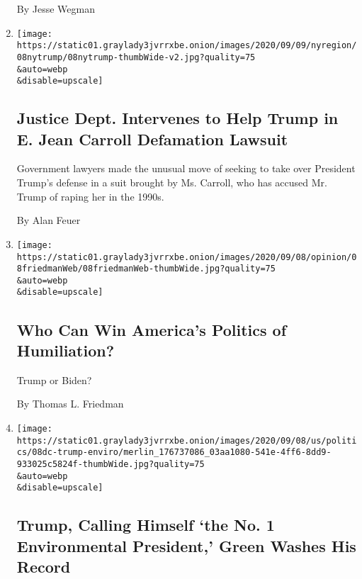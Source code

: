 \begin{enumerate}
  By Jesse Wegman
\item
  \href{/2020/09/08/nyregion/donald-trump-jean-carroll-lawsuit-rape.html}{}

  \texttt{[image: https://static01.graylady3jvrrxbe.onion/images/2020/09/09/nyregion/08nytrump/08nytrump-thumbWide-v2.jpg?quality=75\\\&auto=webp\\\&disable=upscale]}

  \hypertarget{justice-dept-intervenes-to-help-trump-in-e-jean-carroll-defamation-lawsuit}{%
  \subsection{Justice Dept. Intervenes to Help Trump in E. Jean Carroll
  Defamation
  Lawsuit}\label{justice-dept-intervenes-to-help-trump-in-e-jean-carroll-defamation-lawsuit}}

  Government lawyers made the unusual move of seeking to take over
  President Trump's defense in a suit brought by Ms. Carroll, who has
  accused Mr. Trump of raping her in the 1990s.

  By Alan Feuer
\item
  \href{/2020/09/08/opinion/biden-trump-humiliation.html}{}

  \texttt{[image: https://static01.graylady3jvrrxbe.onion/images/2020/09/08/opinion/08friedmanWeb/08friedmanWeb-thumbWide.jpg?quality=75\\\&auto=webp\\\&disable=upscale]}

  \hypertarget{who-can-win-americas-politics-of-humiliation}{%
  \subsection{Who Can Win America's Politics of
  Humiliation?}\label{who-can-win-americas-politics-of-humiliation}}

  Trump or Biden?

  By Thomas L. Friedman
\item
  \href{/2020/09/08/us/politics/trump-drilling-environment-florida.html}{}

  \texttt{[image: https://static01.graylady3jvrrxbe.onion/images/2020/09/08/us/politics/08dc-trump-enviro/merlin\_176737086\_03aa1080-541e-4ff6-8dd9-933025c5824f-thumbWide.jpg?quality=75\\\&auto=webp\\\&disable=upscale]}

  \hypertarget{trump-calling-himself-the-no-1-environmental-president-green-washes-his-record}{%
  \subsection{Trump, Calling Himself `the No. 1 Environmental
  President,' Green Washes His
  Record}\label{trump-calling-himself-the-no-1-environmental-president-green-washes-his-record}}


\end{enumerate}
